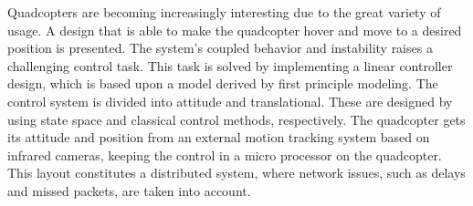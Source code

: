 Quadcopters are becoming increasingly interesting due to the great variety of usage. A design that is able to make the quadcopter hover and move to a desired position is presented. The system’s coupled behavior and instability raises a challenging control task. This task is solved by implementing a linear controller design, which is based upon a model derived by first principle modeling. The control system is divided into attitude and translational. These are designed by using state space and classical control methods, respectively. The quadcopter gets its attitude and position from an external motion tracking system based on infrared cameras, keeping the control in a micro processor on the quadcopter. This layout constitutes a distributed system, where network issues, such as delays and missed packets, are taken into account.